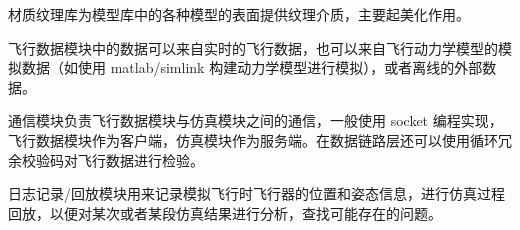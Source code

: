 材质纹理库为模型库中的各种模型的表面提供纹理介质，主要起美化作用。

飞行数据模块中的数据可以来自实时的飞行数据，也可以来自飞行动力学模型的模拟数据（如使用 matlab/simlink 构建动力学模型进行模拟），或者离线的外部数据。

通信模块负责飞行数据模块与仿真模块之间的通信，一般使用 socket 编程实现，飞行数据模块作为客户端，仿真模块作为服务端。在数据链路层还可以使用循环冗余校验码对飞行数据进行检验。

日志记录/回放模块用来记录模拟飞行时飞行器的位置和姿态信息，进行仿真过程回放，以便对某次或者某段仿真结果进行分析，查找可能存在的问题。






